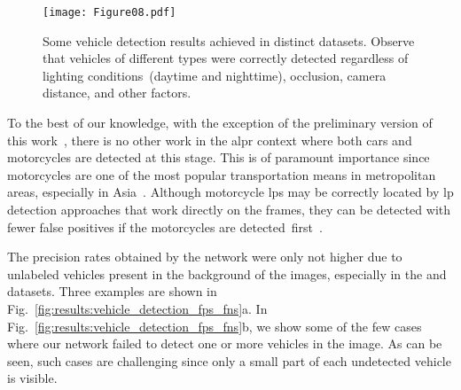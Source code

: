\begin{table}[!htb]
\centering
\caption{Vehicle detection results achieved across all datasets.}
\label{tab:results:vehicle_detection}
\vspace{1mm}
\end{table}

\begin{figure}[!htb]
    \centering
    
    \texttt{[image: Figure08.pdf]} 
    
    \vspace{-2mm}
    
    \caption{Some vehicle detection results achieved in distinct datasets. Observe that vehicles of different types were correctly detected regardless of lighting conditions~(daytime and nighttime), occlusion, camera distance, and other factors.}
    \label{fig:results:veicle_detection_tps}
\end{figure}

To the best of our knowledge, with the exception of the preliminary version of this work~\citep{laroca2018robust}, there is no other work in the \gls*{alpr} context where both cars and motorcycles are detected at this stage.
This is of paramount importance since motorcycles are one of the most popular transportation means in metropolitan areas, especially in Asia~\citep{hsu2016comparison}.
Although motorcycle \glspl*{lp} may be correctly located by \gls*{lp} detection approaches that work directly on the frames, they can be detected with fewer false positives if the motorcycles are detected~first~\citep{hsu2015comparison}. 

The precision rates obtained by the network were only not higher due to unlabeled vehicles present in the background of the images, especially in the \aolp and \ssig datasets. 
Three examples are shown in Fig.~\ref{fig:results:vehicle_detection_fps_fns}a.
In Fig.~\ref{fig:results:vehicle_detection_fps_fns}b, we show some of the few cases where our network failed to detect one or more vehicles in the image. 
As can be seen, such cases are challenging since only a small part of each undetected vehicle is visible.

